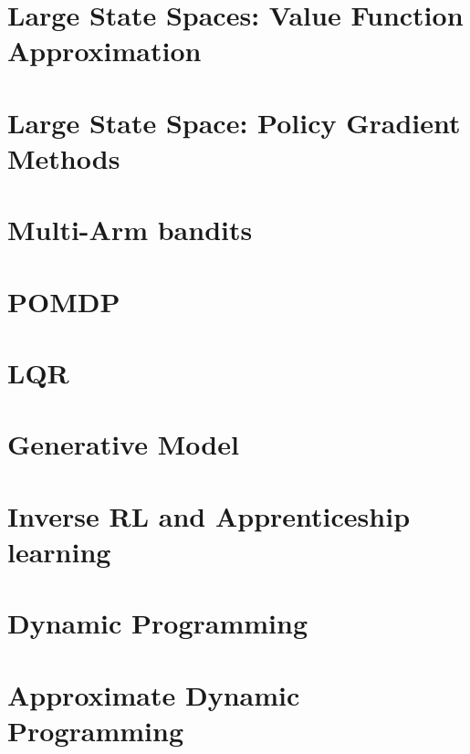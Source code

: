 \documentclass[12pt]{book}
\begin{document}
\chapter{Large State Spaces: Value Function Approximation}
\label{chapter:function-approximation}


\chapter{Large State Space: Policy Gradient Methods}
\label{chapter:policy-gradient}


\chapter{ Multi-Arm bandits}
\label{chapter:MAB}




\chapter{POMDP}
\label{chapter:POMDP}


\chapter{LQR}
\label{chapter:LQR}


\chapter{Generative Model}
\label{chapter:generative}


\chapter{Inverse RL and Apprenticeship learning}
\label{chapter:IRL}


\appendix

\chapter{Dynamic Programming}
\label{chapter:dp}


\chapter{Approximate Dynamic Programming}
\label{chapter:approx-dp}





\end{document}
